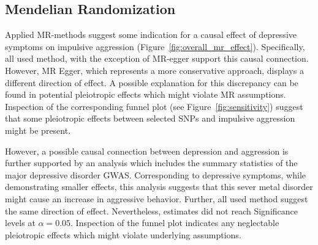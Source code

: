 \subsection{Mendelian Randomization}
\label{sub:mendelian_randomization}

Applied MR-methods suggest some indication for a causal effect of depressive symptoms on impulsive aggression (Figure~\ref{fig:overall_mr_effect}).
Specifically, all used method, with the exception of MR-egger support this causal connection.
However, MR Egger, which represents a more conservative approach, displays a different direction of effect.
A possible explanation for this discrepancy can be found in potential pleiotropic effects which might violate MR assumptions.
Inspection of the corresponding funnel plot (see Figure~\ref{fig:sensitivity}) suggest that some pleiotropic effects between selected SNPs and impulsive aggression might be present.

However, a possible causal connection between depression and aggression is further supported by an analysis which includes the summary statistics of the major depressive disorder GWAS\@.
Corresponding to depressive symptoms, while demonstrating smaller effects, this analysis suggests that this sever metal disorder might cause an increase in aggressive behavior. 
Further, all used method suggest the same direction of effect.
Nevertheless, estimates did not reach Significance levels at $\alpha=0.05$.
Inspection of the funnel plot indicates any neglectable pleiotropic effects which might violate underlying assumptions.

